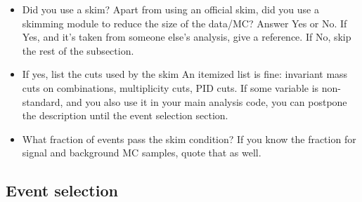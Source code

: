 \begin{itemize}

\item Did you use a skim?
Apart from using an official skim,
did you use a skimming module to reduce the size of the data/MC?
Answer Yes or No.
If Yes, and it's taken from someone else's analysis, give a reference.
If No, skip the rest of the subsection.

\item If yes, list the cuts used by the skim
An itemized list is fine: \eg invariant mass cuts on combinations,
multiplicity cuts, PID cuts.
If some variable is non-standard, and you also use it in your main
analysis code, you can postpone the description until
the event selection section.

\item What fraction of events pass the skim condition?
If you know the fraction for signal and background MC samples, 
quote that as well.

\end{itemize}

\subsection*{Event selection}

